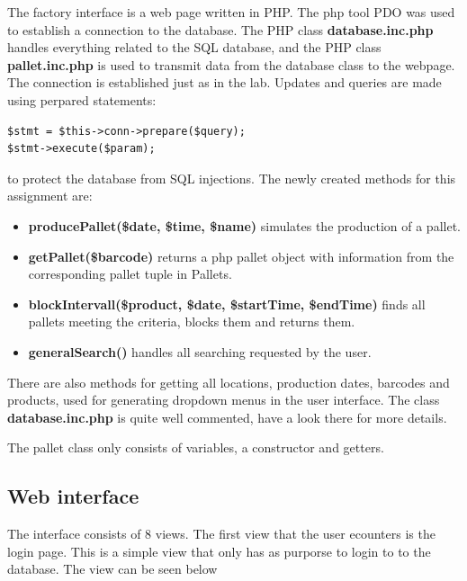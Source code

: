\documentclass[a4paper]{scrartcl}
\numberwithin{equation}{section}
\begin{document}
The factory interface is a web page written in PHP. 
The php tool PDO was used to establish a connection to the database. 
The PHP class \textbf{database.inc.php} handles everything related to the SQL database, and the PHP class \textbf{pallet.inc.php} is used to transmit data from the database class to the webpage.
The connection is established just as in the lab.
Updates and queries are made using perpared statements:
\begin{verbatim}
$stmt = $this->conn->prepare($query);
$stmt->execute($param);
\end{verbatim}
to protect the database from SQL injections. 
The newly created methods for this assignment are:
\begin{itemize}
  \item \textbf{producePallet(\$date, \$time, \$name)} simulates the production of a pallet.
  \item \textbf{getPallet(\$barcode)} returns a php pallet object with information from the corresponding pallet tuple in Pallets.
  \item \textbf{blockIntervall(\$product, \$date, \$startTime, \$endTime)} finds all pallets meeting the criteria, blocks them and returns them.
  \item \textbf{generalSearch()} handles all searching requested by the user.
\end{itemize}
There are also methods for getting all locations, production dates, barcodes and products, used for generating dropdown menus in the user interface. 
The class \textbf{database.inc.php} is quite well commented, have a look there for more details.

The pallet class only consists of variables, a constructor and getters.

\subsection*{Web interface}

The interface consists of 8 views. The first view that the user ecounters is the login page. This is a simple view that only has as purporse to login to to the database. The view can be seen below 
\end{document}
